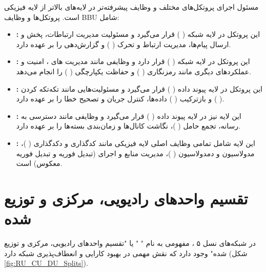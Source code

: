 \documentclass[landscape, 12pt]{report}
\begin{document}
     
        مسئول اجرای پروتکل‌های مختلف و وظایف پیشرفته‌تر در لایه‌های بالاتر از لایه فیزیکی است. پروتکل‌ها و وظایف BBU شامل:
\begin{itemize}
\item
\textbf{
:}
این پروتکل در لایه شبکه (
) قرار می‌گیرد و مسئولیت مدیریت ارتباطات، پخش و ارسال پیام‌ها، مدیریت ارتباط و تحرک (
) و گزارش‌دهی را بر عهده دارد.
\item
 \textbf{
 :}
 این پروتکل در لایه شبکه (
 ) قرار دارد و وظایفی مانند مدیریت
   های
     ، امنیت و عملکردهای دیگری مانند رمزنگاری (
     ) و حفاظت یکپارچگی (
     ) را انجام می‌دهد.
\item
\textbf{
:}
این پروتکل در لایه پیوند داده (
) قرار می‌گیرد و مسئولیت‌هایی مانند تکه‌تکه کردن (
) و بازترکیب  (
) داده‌ها، کنترل جریان و تصحیح خطا را بر عهده دارد.
\item
\textbf{
:}
 این لایه نیز در لایه پیوند داده (
 ) قرار می‌گیرد و وظایفی مانند دسترسی به رسانه، تجمع حامل (
 )، نگاشت کانال‌ها
   و زمان‌بندی بسته‌ها را بر عهده دارد.
\item
\textbf{
:}
این لایه شامل تمامی وظایف اصلی لایه فیزیکی مانند کدگذاری و دکدگذاری (
)، مدولاسیون و دمدولاسیون (
 )، مدیریت منابع و اجرای
  (تبدیل فوریه و تبدیل فوریه معکوس) است.
\end{itemize}

      
\chapter*{تقسیم واحدهای رادیویی، مرکزی و توزیع شده}   
در شبکه‌های نسل ۵ ، مفهومی به نام "
" یا "تقسیم واحدهای رادیویی، مرکزی و توزیع شده" وجود دارد که نقش مهمی در بهبود کارایی و انعطاف‌پذیری شبکه دارد (شکل \ref{fig:RU_CU_DU_Splits}).
\end{document}
